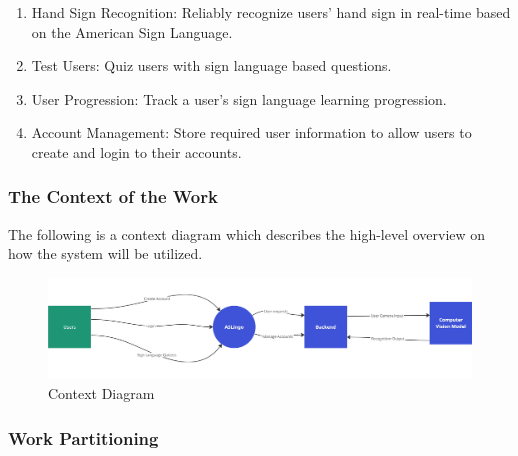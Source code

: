 \documentclass[12pt, titlepage]{article}
\begin{document}
\begin{enumerate}
  \item Hand Sign Recognition: Reliably recognize users' hand sign in real-time based on the American Sign Language.
  \item Test Users: Quiz users with sign language based questions.
  \item User Progression: Track a user's sign language learning progression.
  \item Account Management: Store required user information to allow users to create and login to their accounts.
\end{enumerate}

\subsubsection{The Context of the Work}
The following is a context diagram which describes the high-level overview on how the system will be utilized.

\begin{figure}[H]
    \centering
    \includegraphics[scale=0.25]{context-diagram}
    \caption{Context Diagram}
\end{figure}

\subsubsection{Work Partitioning}
\end{document}
